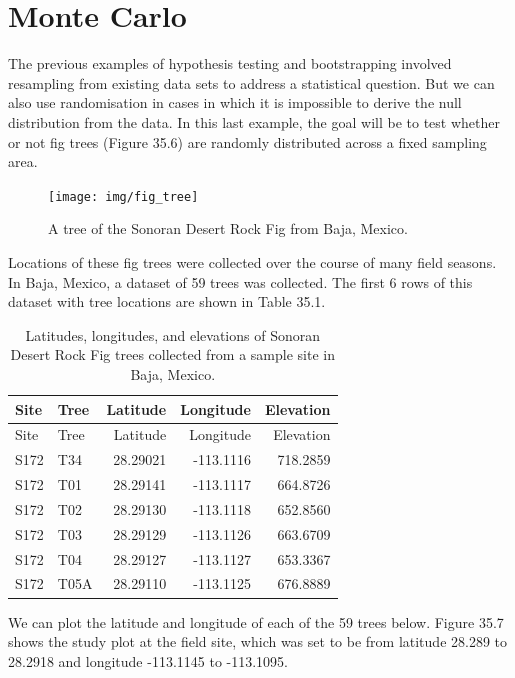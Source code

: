 \documentclass[
]{scrbook}
\begin{document}
\hypertarget{monte-carlo}{%
\section{Monte Carlo}\label{monte-carlo}}

The previous examples of hypothesis testing and bootstrapping involved resampling from existing data sets to address a statistical question.
But we can also use randomisation in cases in which it is impossible to derive the null distribution from the data.
In this last example, the goal will be to test whether or not fig trees (Figure 35.6) are randomly distributed across a fixed sampling area.

\begin{figure}
\texttt{[image: img/fig\_tree]} \caption{A tree of the Sonoran Desert Rock Fig from Baja, Mexico.}\label{fig:unnamed-chunk-189}
\end{figure}

Locations of these fig trees were collected over the course of many field seasons.
In Baja, Mexico, a dataset of 59 trees was collected.
The first 6 rows of this dataset with tree locations are shown in Table 35.1.

\begin{longtable}[]{@{}llrrr@{}}
\caption{\label{tab:unnamed-chunk-191}Latitudes, longitudes, and elevations of Sonoran Desert Rock Fig trees collected from a sample site in Baja, Mexico.}\tabularnewline
\toprule
Site & Tree & Latitude & Longitude & Elevation \\
\midrule
\endfirsthead
\toprule
Site & Tree & Latitude & Longitude & Elevation \\
\midrule
\endhead
S172 & T34 & 28.29021 & -113.1116 & 718.2859 \\
S172 & T01 & 28.29141 & -113.1117 & 664.8726 \\
S172 & T02 & 28.29130 & -113.1118 & 652.8560 \\
S172 & T03 & 28.29129 & -113.1126 & 663.6709 \\
S172 & T04 & 28.29127 & -113.1127 & 653.3367 \\
S172 & T05A & 28.29110 & -113.1125 & 676.8889 \\
\bottomrule
\end{longtable}

We can plot the latitude and longitude of each of the 59 trees below.
Figure 35.7 shows the study plot at the field site, which was set to be from latitude 28.289 to 28.2918 and longitude -113.1145 to -113.1095.
\end{document}
